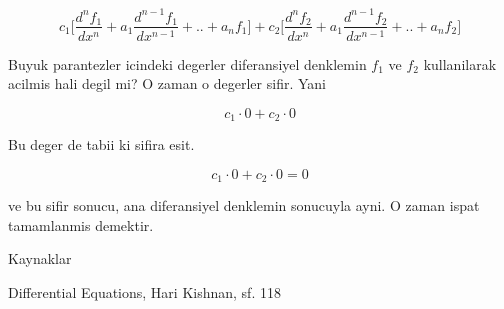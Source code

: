 \documentclass[12pt,fleqn]{article}
\begin{document}
\[ 
c_1 \bigg[
\frac{d^nf_1}{dx^n} + a_1 \frac{d^{n-1}f_1}{dx^{n-1}} + .. + a_n f_1
\bigg] +
c_2 \bigg[
\frac{d^nf_2}{dx^n} + a_1 \frac{d^{n-1}f_2}{dx^{n-1}} + .. + a_n f_2
\bigg]
 \]

Buyuk parantezler icindeki degerler diferansiyel denklemin $f_1$ ve $f_2$
kullanilarak acilmis hali degil mi? O zaman o degerler sifir. Yani

\[ c_1 \cdot 0 + c_2 \cdot 0 \]

Bu deger de tabii ki sifira esit. 

\[ c_1 \cdot 0 + c_2 \cdot 0 = 0\]

ve bu sifir sonucu, ana diferansiyel denklemin sonucuyla ayni. O zaman
ispat tamamlanmis demektir.

Kaynaklar 

Differential Equations, Hari Kishnan, sf. 118
\end{document}
